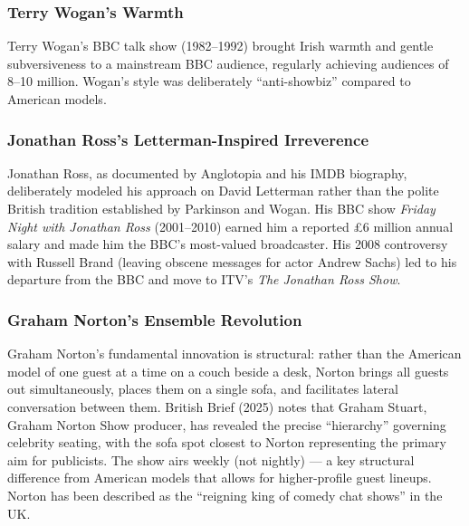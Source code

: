 \documentclass[11pt,letterpaper]{article}
\begin{document}
\subsubsection{Terry Wogan's Warmth}
Terry Wogan's BBC talk show (1982--1992) brought Irish warmth and gentle subversiveness to a mainstream BBC audience, regularly achieving audiences of 8--10 million. Wogan's style was deliberately ``anti-showbiz'' compared to American models.

\subsubsection{Jonathan Ross's Letterman-Inspired Irreverence}
Jonathan Ross, as documented by Anglotopia and his IMDB biography, deliberately modeled his approach on David Letterman rather than the polite British tradition established by Parkinson and Wogan. His BBC show \textit{Friday Night with Jonathan Ross} (2001--2010) earned him a reported £6 million annual salary and made him the BBC's most-valued broadcaster. His 2008 controversy with Russell Brand (leaving obscene messages for actor Andrew Sachs) led to his departure from the BBC and move to ITV's \textit{The Jonathan Ross Show}.

\subsubsection{Graham Norton's Ensemble Revolution}
Graham Norton's fundamental innovation is structural: rather than the American model of one guest at a time on a couch beside a desk, Norton brings all guests out simultaneously, places them on a single sofa, and facilitates lateral conversation between them. British Brief (2025) notes that Graham Stuart, Graham Norton Show producer, has revealed the precise ``hierarchy'' governing celebrity seating, with the sofa spot closest to Norton representing the primary aim for publicists. The show airs weekly (not nightly) --- a key structural difference from American models that allows for higher-profile guest lineups. Norton has been described as the ``reigning king of comedy chat shows'' in the UK.
\end{document}
